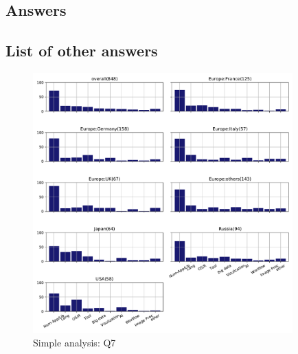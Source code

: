 
\subsection{Answers}


\subsection{List of other answers}
\begin{itemize}

\end{itemize}

\begin{figure}[htb]
\begin{center}
\includegraphics[width=10cm]{../pdfs/Q7.pdf}
\caption{Simple analysis: Q7}
\label{fig:Q7}
\end{center}
\end{figure}
